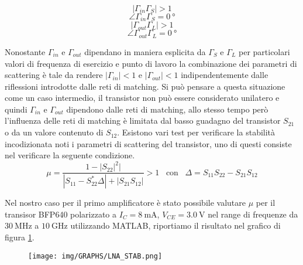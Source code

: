\documentclass[12pt,oneside]{book}
\begin{document}
\begin{equation}
    \left|\Gamma_{in}\Gamma_{S}\right| > 1
\end{equation}
\begin{equation}
    \angle\Gamma_{in}\Gamma_{S} = \SI{0}{\degree}
\end{equation}
\begin{equation}
    \left|\Gamma_{out}\Gamma_{L}\right| > 1
\end{equation}
\begin{equation}
    \angle\Gamma_{out}\Gamma_{L} = \SI{0}{\degree}
\end{equation}

Nonostante $\Gamma_{in}$ e $\Gamma_{out}$ dipendano in maniera esplicita da $\Gamma_{S}$ e $\Gamma_{L}$ per particolari valori di frequenza di esercizio e punto di lavoro la combinazione dei parametri di scattering è tale da rendere $|\Gamma_{in}|<1$ e $|\Gamma_{out}|<1$ indipendentemente dalle riflessioni introdotte dalle reti di matching. Si può pensare a questa situazione come un caso intermedio, il transistor non può essere considerato unilatero e quindi $\Gamma_{in}$ e $\Gamma_{out}$ dipendono dalle reti di matching, allo stesso tempo però l'influenza delle reti di matching è limitata dal basso guadagno del transistor $S_{21}$ o da un valore contenuto di $S_{12}$. Esistono vari test per verificare la stabilità incodizionata noti i parametri di scattering del transistor, uno di questi consiste nel verificare la seguente condizione.
\begin{equation}
    \mu = \dfrac{1-\left|S_{22}\right|^2|}{\left|S_{11}-S_{22}^{*}\Delta\right|+\left|S_{21}S_{12}\right|}> 1 \hspace{10pt} \text{con} \hspace{10pt} \Delta=S_{11}S_{22}-S_{21}S_{12}
    \label{mu_factor}
\end{equation}

Nel nostro caso per il primo amplificatore è stato possibile valutare $\mu$ per il transisor BFP640 polarizzato a $I_{C}=\SI{8}{\milli\ampere}$, $V_{CE}=\SI{3.0}{\volt}$ nel range di frequenze da $\SI{30}{\mega\hertz}$ a $\SI{10}{\giga\hertz}$ utilizzando MATLAB, riportiamo il risultato nel grafico di figura \ref{stab_test}.
\begin{figure}[!htbp]
    \centering
        \texttt{[image: img/GRAPHS/LNA\_STAB.png]}
        \caption{}
        \label{stab_test}
\end{figure}
\end{document}
